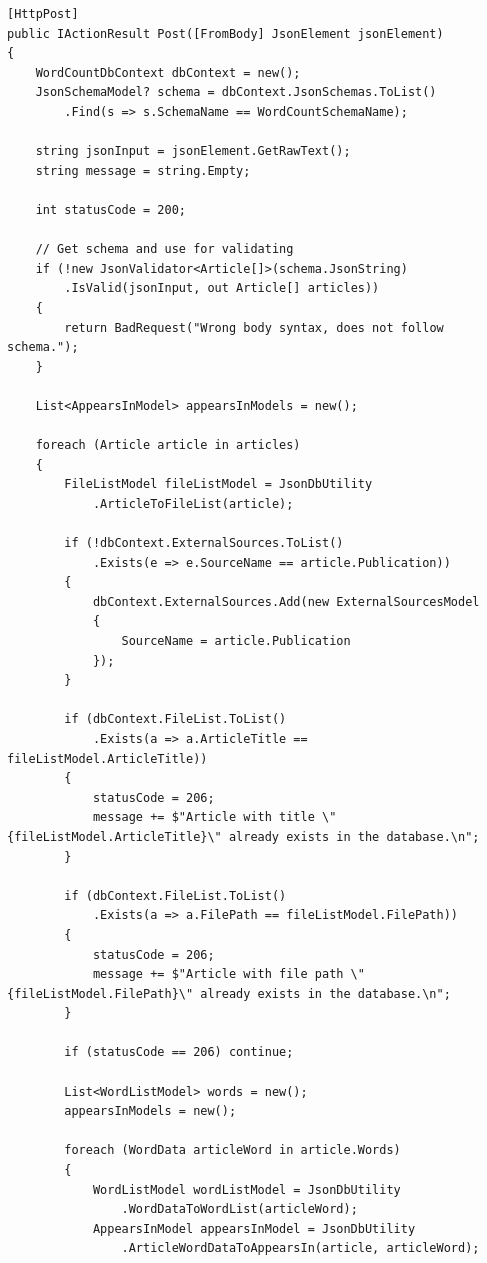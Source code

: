 \begin{lstlisting}[language=CSharp, caption={Old controller}, label={lst:old_controller}]
[HttpPost]
public IActionResult Post([FromBody] JsonElement jsonElement)
{
    WordCountDbContext dbContext = new();
    JsonSchemaModel? schema = dbContext.JsonSchemas.ToList()
        .Find(s => s.SchemaName == WordCountSchemaName);

    string jsonInput = jsonElement.GetRawText();
    string message = string.Empty;

    int statusCode = 200;

    // Get schema and use for validating
    if (!new JsonValidator<Article[]>(schema.JsonString)
        .IsValid(jsonInput, out Article[] articles))
    {
        return BadRequest("Wrong body syntax, does not follow schema.");
    }

    List<AppearsInModel> appearsInModels = new();
        
    foreach (Article article in articles)
    {
        FileListModel fileListModel = JsonDbUtility
            .ArticleToFileList(article);

        if (!dbContext.ExternalSources.ToList()
            .Exists(e => e.SourceName == article.Publication))
        {
            dbContext.ExternalSources.Add(new ExternalSourcesModel 
            { 
                SourceName = article.Publication 
            });
        }

        if (dbContext.FileList.ToList()
            .Exists(a => a.ArticleTitle == fileListModel.ArticleTitle))
        {
            statusCode = 206;
            message += $"Article with title \"{fileListModel.ArticleTitle}\" already exists in the database.\n";
        }

        if (dbContext.FileList.ToList()
            .Exists(a => a.FilePath == fileListModel.FilePath))
        {
            statusCode = 206;
            message += $"Article with file path \"{fileListModel.FilePath}\" already exists in the database.\n";
        }
            
        if (statusCode == 206) continue;
            
        List<WordListModel> words = new();
        appearsInModels = new();

        foreach (WordData articleWord in article.Words)
        {
            WordListModel wordListModel = JsonDbUtility
                .WordDataToWordList(articleWord);
            AppearsInModel appearsInModel = JsonDbUtility
                .ArticleWordDataToAppearsIn(article, articleWord);


\end{lstlisting}
